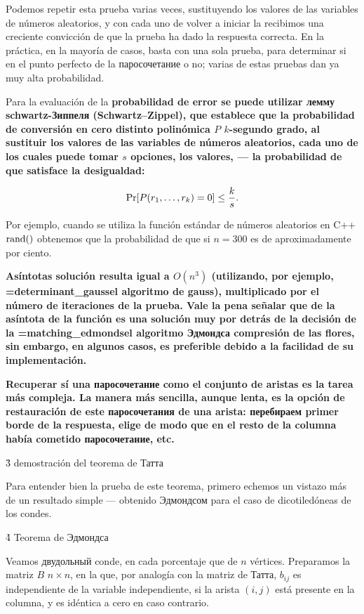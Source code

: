 Podemos repetir esta prueba varias veces, sustituyendo los valores de las variables de números aleatorios, y con cada uno de volver a iniciar la recibimos una creciente convicción de que la prueba ha dado la respuesta correcta. En la práctica, en la mayoría de casos, basta con una sola prueba, para determinar si en el punto perfecto de la паросочетание o no; varias de estas pruebas dan ya muy alta probabilidad.

Para la evaluación de la \bf{probabilidad de error} se puede utilizar лемму schwartz-Зиппеля (Schwartz–Zippel), que establece que la probabilidad de conversión en cero distinto polinómica $P$ $k$-segundo grado, al sustituir los valores de las variables de números aleatorios, cada uno de los cuales puede tomar $s$ opciones, los valores, --- la probabilidad de que satisface la desigualdad:

$$ {\rm Pr}[P(r_1,\ldots,r_k)=0] \le \frac{k}{s}. $$

Por ejemplo, cuando se utiliza la función estándar de números aleatorios en C++ $\rm rand()$ obtenemos que la probabilidad de que si $n=300$ es de aproximadamente por ciento.

\bf{Asíntotas} solución resulta igual a $O(n^3)$ (utilizando, por ejemplo, \algohref=determinant_gauss{el algoritmo de gauss}), multiplicado por el número de iteraciones de la prueba. Vale la pena señalar que de la asíntota de la función es una solución muy por detrás de la decisión de la \algohref=matching_edmonds{el algoritmo Эдмондса compresión de las flores}, sin embargo, en algunos casos, es preferible debido a la facilidad de su implementación.

\bf{Recuperar} sí una паросочетание como el conjunto de aristas es la tarea más compleja. La manera más sencilla, aunque lenta, es la opción de restauración de este паросочетания de una arista: перебираем primer borde de la respuesta, elige de modo que en el resto de la columna había cometido паросочетание, etc.


\h3{ demostración del teorema de Татта }

Para entender bien la prueba de este teorema, primero echemos un vistazo más de un resultado simple --- obtenido Эдмондсом para el caso de dicotiledóneas de los condes.


\h4{ Teorema de Эдмондса }

Veamos двудольный conde, en cada porcentaje que de $n$ vértices. Preparamos la matriz $B$ $n \times n$, en la que, por analogía con la matriz de Татта, $b_{ij}$ es independiente de la variable independiente, si la arista $(i,j)$ está presente en la columna, y es idéntica a cero en caso contrario.

